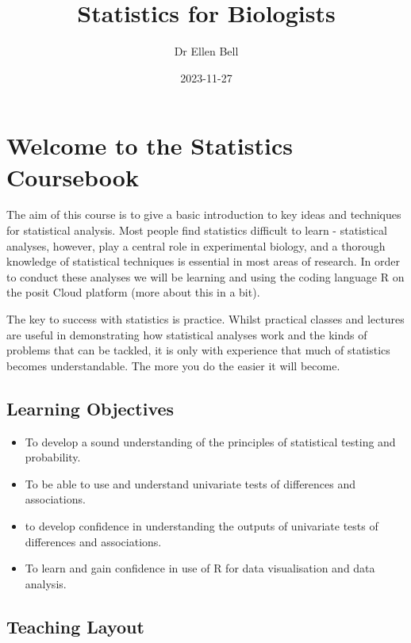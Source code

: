 \documentclass[
]{book}
\title{Statistics for Biologists}
\author{Dr Ellen Bell}
\date{2023-11-27}
\providecommand{\tightlist}{%
  \setlength{\itemsep}{0pt}\setlength{\parskip}{0pt}}
\begin{document}
\maketitle

{
\setcounter{tocdepth}{1}
\tableofcontents
}
\hypertarget{c1}{%
\chapter{Welcome to the Statistics Coursebook}\label{c1}}

The aim of this course is to give a basic introduction to key ideas and techniques for statistical analysis. Most people find statistics difficult to learn - statistical analyses, however, play a central role in experimental biology, and a thorough knowledge of statistical techniques is essential in most areas of research. In order to conduct these analyses we will be learning and using the coding language R on the posit Cloud platform (more about this in a bit).

The key to success with statistics is practice. Whilst practical classes and lectures are useful in demonstrating how statistical analyses work and the kinds of problems that can be tackled, it is only with experience that much of statistics becomes understandable. The more you do the easier it will become.

\hypertarget{learning-objectives}{%
\section{Learning Objectives}\label{learning-objectives}}

\begin{itemize}
\tightlist
\item
  To develop a sound understanding of the principles of statistical testing and probability.
\item
  To be able to use and understand univariate tests of differences and associations.
\item
  to develop confidence in understanding the outputs of univariate tests of differences and associations.
\item
  To learn and gain confidence in use of R for data visualisation and data analysis.
\end{itemize}

\hypertarget{teaching-layout}{%
\section{Teaching Layout}\label{teaching-layout}}
\end{document}
